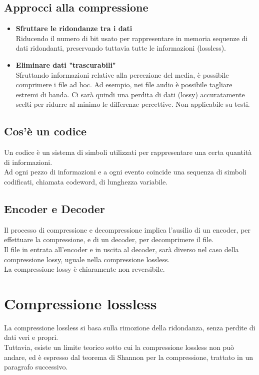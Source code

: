 \documentclass{report}
\begin{document}
	\subsection{Approcci alla compressione}
	\begin{itemize}
		\item \textbf{Sfruttare le ridondanze tra i dati}\\
		      Riducendo il numero di bit usato per rappresentare in memoria sequenze di dati ridondanti, preservando tuttavia tutte le informazioni (lossless).
		\item \textbf{Eliminare dati "trascurabili"\\}
		      Sfruttando informazioni relative alla percezione del media, è possibile comprimere i file ad hoc. Ad esempio, nei file audio è possibile tagliare estremi di banda. Ci sarà quindi una perdita di dati (lossy) accuratamente scelti per ridurre al minimo le differenze percettive. Non applicabile su testi.
	\end{itemize}
	
	\subsection{Cos'è un codice}
	Un codice è un sistema di simboli utilizzati per rappresentare una certa quantità di informazioni.\\
	Ad ogni pezzo di informazioni e a ogni evento coincide una sequenza di simboli codificati, chiamata codeword, di lunghezza variabile.
	
	\subsection{Encoder e Decoder}
	Il processo di compressione e decompressione implica l'ausilio di un encoder, per effettuare la compressione, e di un decoder, per decomprimere il file.\\
	Il file in entrata all'encoder e in uscita al decoder, sarà diverso nel caso della compressione lossy, uguale nella compressione lossless.\\
	La compressione lossy è chiaramente non reversibile.
	
	\newpage
	
	\section{Compressione lossless}
	La compressione lossless si basa sulla rimozione della ridondanza, senza perdite di dati veri e propri.\\
	Tuttavia, esiste un limite teorico  sotto cui la compressione lossless non può andare, ed è espresso dal teorema di Shannon per la compressione, trattato in un paragrafo successivo.
\end{document}
